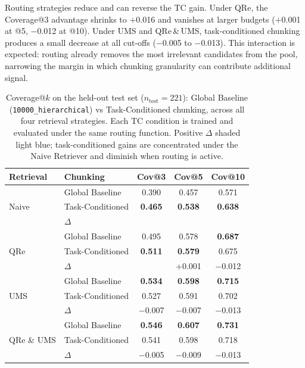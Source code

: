 Routing strategies reduce and can reverse the TC gain. Under QRe, the Coverage@3 advantage shrinks to $+$0.016 and vanishes at larger
budgets ($+$0.001 at @5, $-$0.012 at @10).
Under UMS and QRe\,\&\,UMS, task-conditioned chunking produces a small decrease at all cut-offs ($-$0.005 to $-$0.013).
This interaction is expected: routing already removes the most irrelevant
candidates from the pool, narrowing the margin in which chunking granularity
can contribute additional signal.

\begin{table}[htbp]
\centering
\small
\setlength{\tabcolsep}{4pt}
\begin{tabular}{ll ccc}
\toprule
\textbf{Retrieval} & \textbf{Chunking} & \textbf{Cov@3} & \textbf{Cov@5} & \textbf{Cov@10} \\
\midrule
\multirow{3}{*}{Naive}
  & Global Baseline  & 0.390 & 0.457 & 0.571 \\
  & Task-Conditioned & \textbf{0.465} & \textbf{0.538} & \textbf{0.638} \\
  & $\Delta$         & \cellcolor{db1}{+0.075} & \cellcolor{db1}{+0.081} & \cellcolor{db1}{+0.067} \\
\midrule
\multirow{3}{*}{QRe}
  & Global Baseline  & 0.495 & 0.578 & \textbf{0.687} \\
  & Task-Conditioned & \textbf{0.511} & \textbf{0.579} & 0.675 \\
  & $\Delta$         & \cellcolor{db1}{+0.016} & +0.001 & $-$0.012 \\
\midrule
\multirow{3}{*}{UMS}
  & Global Baseline  & \textbf{0.534} & \textbf{0.598} & \textbf{0.715} \\
  & Task-Conditioned & 0.527 & 0.591 & 0.702 \\
  & $\Delta$         & $-$0.007 & $-$0.007 & $-$0.013 \\
\midrule
\multirow{3}{*}{QRe \& UMS}
  & Global Baseline  & \textbf{0.546} & \textbf{0.607} & \textbf{0.731} \\
  & Task-Conditioned & 0.541 & 0.598 & 0.718 \\
  & $\Delta$         & $-$0.005 & $-$0.009 & $-$0.013 \\
\bottomrule
\end{tabular}
\caption{Coverage@$k$ on the held-out test set ($n_{\text{test}}{=}221$):
Global Baseline (\texttt{10000\_hierarchical}) vs Task-Conditioned chunking,
across all four retrieval strategies.
Each TC condition is trained and evaluated under the same routing function.
Positive $\Delta$ shaded light blue; task-conditioned gains are concentrated
under the Naive Retriever and diminish when routing is active.}
\label{tab:tc-inference}
\end{table}

